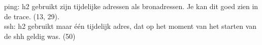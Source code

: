 ping: h2 gebruikt zijn tijdelijke adressen als bronadressen. Je kan dit goed zien in de trace. (13, 29).\\

ssh: h2 gebruikt maar één tijdelijk adres, dat op het moment van het starten van de shh geldig was. (50)


